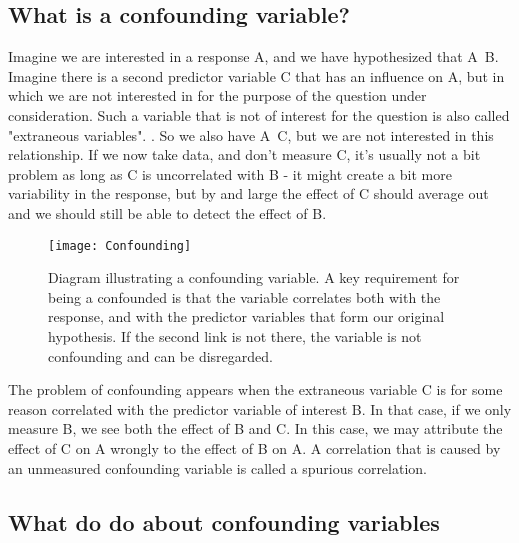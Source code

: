 \documentclass[a4paper,twoside]{tufte-book}\usepackage[]{graphicx}\usepackage[]{color}
\begin{document}
\subsection{What is a confounding variable?}

Imagine we are interested in a response A, and we have hypothesized that A~B. Imagine there is a second predictor variable C that has an influence on A, but in which we are not interested in for the purpose of the question under consideration. Such a variable that is not of interest for the question is also called "extraneous variables". . So we also have A~C, but we are not interested in this relationship. If we now take data, and don't measure C, it's usually not a bit problem as long as C is uncorrelated with B - it might create a bit more variability in the response, but by and large the effect of C should average out and we should still be able to detect the effect of B.

\begin{figure}[]
\begin{center}
\texttt{[image: Confounding]}
\caption{Diagram illustrating a confounding variable. A key requirement for being a confounded is that the variable correlates both with the response, and with the predictor variables that form our original hypothesis. If the second link is not there, the variable is not confounding and can be disregarded.}
\label{fig: Confounding}
\end{center}
\end{figure}

The problem of confounding appears when the extraneous variable C is for some reason correlated with the predictor variable of interest B.  In that case, if we only measure B, we see both the effect of B and C. In this case, we may attribute the effect of C on A wrongly to the effect of B on A.  A correlation that is caused by an unmeasured confounding variable is called a spurious correlation.  

\subsection{What do do about confounding variables}
\end{document}
